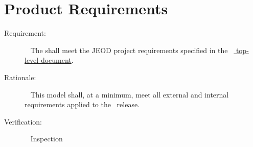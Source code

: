 %
% 

\chapter{Product Requirements}
\label{ch:reqt}

\label{reqt:toplevel}
\begin{description}
\item[Requirement:]\ \newline
  The \ModelDesc shall meet the JEOD project requirements specified in
  the \JEODid\
  \hyperref{file:\JEODHOME/docs/JEOD.pdf}{part1}{reqt}{ top-level
  document}.
\item[Rationale:]\ \newline
  This model shall, at a minimum, meet all external and
  internal requirements 
  applied to the \JEODid\ release.
\item[Verification:]\ \newline
  Inspection 
\end{description}


